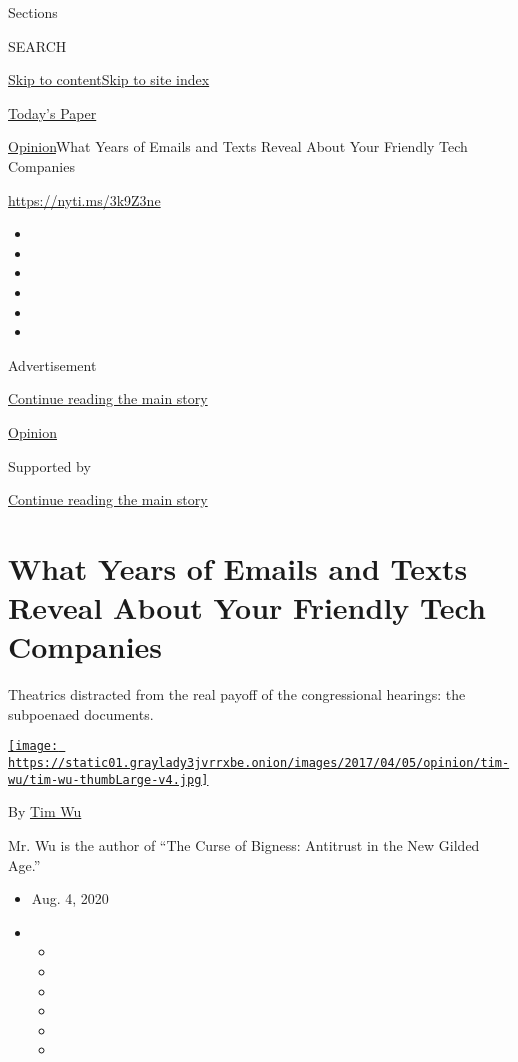 Sections

SEARCH

\protect\hyperlink{site-content}{Skip to
content}\protect\hyperlink{site-index}{Skip to site index}

\href{https://myaccount.nytimes3xbfgragh.onion/auth/login?response_type=cookie\&client_id=vi}{}

\href{https://www.nytimes3xbfgragh.onion/section/todayspaper}{Today's
Paper}

\href{/section/opinion}{Opinion}\textbar{}What Years of Emails and Texts
Reveal About Your Friendly Tech Companies

\url{https://nyti.ms/3k9Z3ne}

\begin{itemize}
\item
\item
\item
\item
\item
\item
\end{itemize}

Advertisement

\protect\hyperlink{after-top}{Continue reading the main story}

\href{/section/opinion}{Opinion}

Supported by

\protect\hyperlink{after-sponsor}{Continue reading the main story}

\hypertarget{what-years-of-emails-and-texts-reveal-about-your-friendly-tech-companies}{%
\section{What Years of Emails and Texts Reveal About Your Friendly Tech
Companies}\label{what-years-of-emails-and-texts-reveal-about-your-friendly-tech-companies}}

Theatrics distracted from the real payoff of the congressional hearings:
the subpoenaed documents.

\href{https://www.nytimes3xbfgragh.onion/by/tim-wu}{\texttt{[image: https://static01.graylady3jvrrxbe.onion/images/2017/04/05/opinion/tim-wu/tim-wu-thumbLarge-v4.jpg]}}

By \href{https://www.nytimes3xbfgragh.onion/by/tim-wu}{Tim Wu}

Mr. Wu is the author of ``The Curse of Bigness: Antitrust in the New
Gilded Age.''

\begin{itemize}
\item
  Aug. 4, 2020
\item
  \begin{itemize}
  \item
  \item
  \item
  \item
  \item
  \item
  \end{itemize}
\end{itemize}


